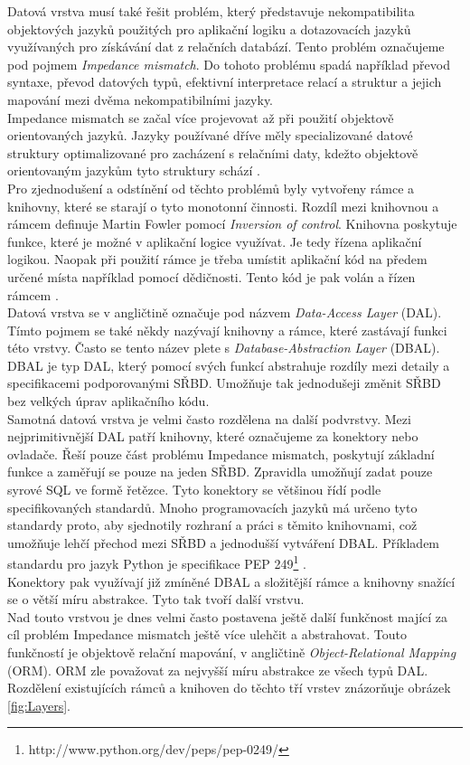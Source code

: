 \documentclass[ing,male,java,dept456]{diploma}						%
\begin{document}
Datová vrstva musí také řešit problém, který představuje nekompatibilita objektových jazyků použitých pro aplikační logiku a dotazovacích jazyků využívaných pro získávání dat z relačních databází. Tento problém označujeme pod pojmem \textit{Impedance mismatch}. Do tohoto problému spadá například převod syntaxe, převod datových typů, efektivní interpretace relací a struktur a jejich mapování mezi dvěma nekompatibilními jazyky. \\
Impedance mismatch se začal více projevovat až při použití objektově orientovaných jazyků. Jazyky používané dříve měly specializované datové struktury optimalizované pro zacházení s relačními daty, kdežto objektově orientovaným jazykům tyto struktury schází \cite{dbprogrammer}. \\

Pro zjednodušení a odstínění od těchto problémů byly vytvořeny rámce a knihovny, které se starají o tyto monotonní činnosti. Rozdíl mezi knihovnou a rámcem definuje Martin Fowler pomocí \textit{Inversion of control}. Knihovna poskytuje funkce, které je možné v aplikační logice využívat. Je tedy řízena aplikační logikou. Naopak při použití rámce je třeba umístit aplikační kód na předem určené místa například pomocí dědičnosti. Tento kód je pak volán a řízen rámcem \cite{fowler-ioc}.  \\

Datová vrstva se v angličtině označuje pod názvem \textit{Data-Access Layer} (DAL). Tímto pojmem se také někdy nazývají knihovny a rámce, které zastávají funkci této vrstvy. Často se tento název plete s \textit{Database-Abstraction Layer} (DBAL). DBAL je typ DAL, který pomocí svých funkcí abstrahuje rozdíly mezi detaily a specifikacemi podporovanými SŘBD. Umožňuje tak jednodušeji změnit SŘBD bez velkých úprav aplikačního kódu. \\

Samotná datová vrstva je velmi často rozdělena na další podvrstvy. Mezi nejprimitivnější DAL patří knihovny, které označujeme za konektory nebo ovladače. Řeší pouze část problému Impedance mismatch, poskytují základní funkce a zaměřují se pouze na jeden SŘBD. Zpravidla umožňují zadat pouze syrové SQL ve formě řetězce. Tyto konektory se většinou řídí podle specifikovaných standardů. Mnoho programovacích jazyků má určeno tyto standardy proto, aby sjednotily rozhraní a práci s těmito knihovnami, což umožňuje lehčí přechod mezi SŘBD a jednodušší vytváření DBAL. Příkladem standardu pro jazyk Python je specifikace PEP 249\footnote{http://www.python.org/dev/peps/pep-0249/} .\\
Konektory pak využívají již zmíněné DBAL a složitější rámce a knihovny snažící se o větší míru abstrakce. Tyto tak tvoří další vrstvu. \\
Nad touto vrstvou je dnes velmi často postavena ještě další funkčnost mající za cíl problém Impedance mismatch ještě více ulehčit a abstrahovat. Touto funkčností je objektově relační mapování, v angličtině \textit{Object-Relational Mapping} (ORM). ORM zle považovat za nejvyšší míru abstrakce ze všech typů DAL.  \\
Rozdělení existujících rámců a knihoven do těchto tří vrstev znázorňuje obrázek \ref{fig:Layers}.
\end{document}
